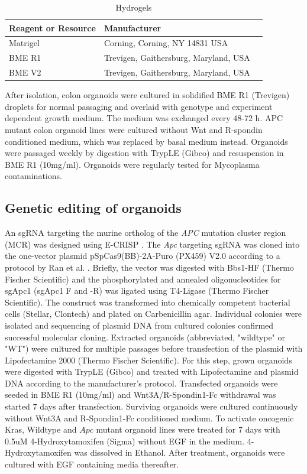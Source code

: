 \begin{flushleft}
\begin{table}[htb]
\caption{Hydrogels}
\label{tab:hydrogels} %
\begin{tabularx}{\textwidth}{XlX}
\toprule
\textbf{Reagent or Resource} & \textbf{Manufacturer} \\
\midrule
Matrigel & Corning, Corning, NY 14831 USA \\
BME R1 & Trevigen, Gaithersburg, Maryland, USA \\
BME V2 & Trevigen, Gaithersburg, Maryland, USA \\
\bottomrule
\end{tabularx}
\end{table}

After isolation, colon organoids were cultured in solidified BME R1 (Trevigen) droplets for normal passaging and overlaid with genotype and experiment dependent growth medium. The medium was exchanged every 48-72 h. 
APC mutant colon organoid lines were cultured without Wnt and R-spondin conditioned medium, which was replaced by basal medium instead.
Organoids were passaged weekly by digestion with TrypLE (Gibco) and resuspension in BME R1 (10mg/ml). 
Organoids were regularly tested for Mycoplasma contaminations.  

\subsection{Genetic editing of organoids}
An sgRNA targeting the murine ortholog of the \textit{APC} mutation cluster region (MCR) was designed using E-CRISP \parencite{heigwerECRISPFastCRISPR2014}. The \textit{Apc} targeting sgRNA was cloned into the one-vector plasmid pSpCas9(BB)-2A-Puro (PX459) V2.0 according to a protocol by Ran et al. \parencite{ranGenomeEngineeringUsing2013}. Briefly, the vector was digested with Bbs1-HF (Thermo Fischer Scientific) and the phosphorylated and annealed oligonucleotides for sgApc1 (sgApc1 F and -R) was ligated using T4-Ligase (Thermo Fischer Scientific). The construct was transformed into chemically competent bacterial cells (Stellar, Clontech) and plated on Carbenicillin agar. Individual colonies were isolated and sequencing of plasmid DNA from cultured colonies confirmed successful molecular cloning.   
Extracted organoids (abbreviated, "wildtype" or "WT") were cultured for multiple passages before transfection of the plasmid with Lipofectamine 2000 (Thermo Fischer Scientific). For this step, grown organoids were digested with TrypLE (Gibco) and treated with Lipofectamine and plasmid DNA according to the manufacturer’s protocol. Transfected organoids were seeded in BME R1 (10mg/ml) and Wnt3A/R-Spondin1-Fc withdrawal was started 7 days after transfection. Surviving organoids were cultured continuously without Wnt3A and R-Spondin1-Fc conditioned medium.
To activate oncogenic Kras, Wildtype and $Apc$ mutant organoid lines were treated for 7 days with 0.5uM 4-Hydroxytamoxifen (Sigma) without EGF in the medium. 4-Hydroxytamoxifen was dissolved in Ethanol. After treatment, organoids were cultured with EGF containing media thereafter.


\end{flushleft}
